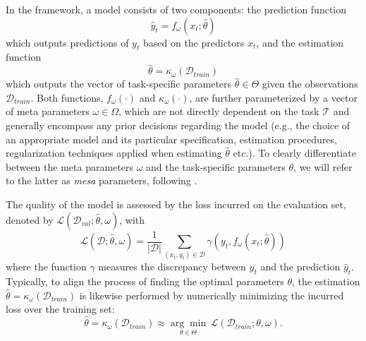 \documentclass[3p,times,twocolumn]{elsarticle}
\begin{document}
In the framework, a model consists of two components: the prediction function
\begin{equation}
    \hat{y}_{t}=f_{\omega}(x_{t};\hat{\theta})
\end{equation}
which outputs predictions of $y_{t}$ based on the predictors $x_{t}$, and the estimation function
\begin{equation}
    \hat{\theta} = \kappa_{\omega} (\mathcal{D}_{train})
\end{equation}
which outputs the vector of task-specific parameters $\hat{\theta}\in \Theta$ given the observations $\mathcal{D}_{train}$.
Both functions, $f_{\omega}(\cdot)$ and $\kappa_{\omega}(\cdot)$, are further parameterized by a vector of meta parameters $\omega \in \Omega$,  which are not directly dependent on the task $\mathcal{T}$ and generally encompass any prior decisions regarding the model (e.g., the choice of an appropriate model and its particular specification, estimation procedures, regularization techniques applied when estimating $\hat{\theta}$ etc.).
To clearly differentiate between the meta parameters $\omega$ and the task-specific parameters $\theta$, we will refer to the latter as \emph{mesa} parameters, following \citet{hubingerRisksLearnedOptimization2021}.

The quality of the model is assessed by the loss incurred on the evaluation set, denoted by $\mathcal{L}(\mathcal{D}_{val}; \hat{\theta}, \omega)$, with
\begin{equation}
    \mathcal{L}(\mathcal{D}; \hat{\theta}, \omega)  = \dfrac{1}{|\mathcal{D}|} \sum_{(x_{t}, y_{t})\in \mathcal{D}} \gamma\left( y_{t}, f_{\omega}(x_{t};\hat{\theta})\right)
\end{equation}
where the function $\gamma$ measures the discrepancy between $y_{t}$ and the prediction $\hat{y}_{t}$.
Typically, to align the process of finding the optimal parameters $\theta$, the estimation $\hat{\theta} = \kappa_{\omega} (\mathcal{D}_{train})$ is likewise performed by numerically minimizing the incurred loss over the training set:
\begin{equation}
    \hat{\theta} = \kappa_{\omega} (\mathcal{D}_{train}) \approx \underset{\theta \in \Theta}{\arg\min} \, \mathcal{L}(\mathcal{D}_{train};\theta, \omega).
\end{equation}
\end{document}

